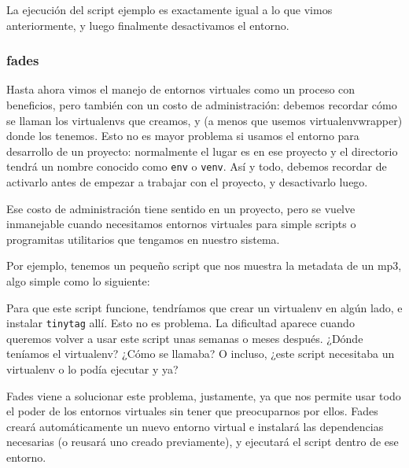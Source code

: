 La ejecución del script ejemplo es exactamente igual a lo que vimos anteriormente, y luego finalmente desactivamos el entorno.



\subsubsection{fades}

Hasta ahora vimos el manejo de entornos virtuales como un proceso con beneficios, pero también con un costo de administración: debemos recordar cómo se llaman los virtualenvs que creamos, y (a menos que usemos virtualenvwrapper) donde los tenemos. Esto no es mayor problema si usamos el entorno para desarrollo de un proyecto: normalmente el lugar es en ese proyecto y el directorio tendrá un nombre conocido como \texttt{env} o \texttt{venv}. Así y todo, debemos recordar de activarlo antes de empezar a trabajar con el proyecto, y desactivarlo luego.

Ese costo de administración tiene sentido en un proyecto, pero se vuelve inmanejable cuando necesitamos entornos virtuales para simple scripts o programitas utilitarios que tengamos en nuestro sistema.

Por ejemplo, tenemos un pequeño script que nos muestra la metadata de un mp3, algo simple como lo siguiente:


Para que este script funcione, tendríamos que crear un virtualenv en algún lado, e instalar \texttt{tinytag} allí. Esto no es problema. La dificultad aparece cuando queremos volver a usar este script unas semanas o meses después. ¿Dónde teníamos el virtualenv? ¿Cómo se llamaba? O incluso, ¿este script necesitaba un virtualenv o lo podía ejecutar y ya?

Fades viene a solucionar este problema, justamente, ya que nos permite usar todo el poder de los entornos virtuales sin tener que preocuparnos por ellos. Fades creará automáticamente un nuevo entorno virtual e instalará las dependencias necesarias (o reusará uno creado previamente), y ejecutará el script dentro de ese entorno.

